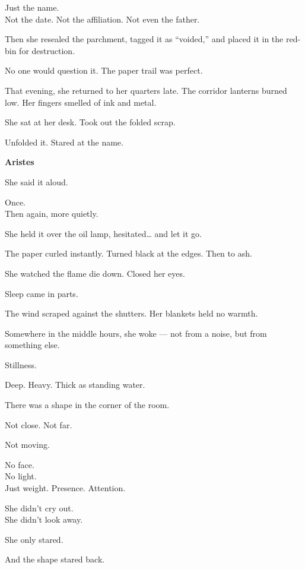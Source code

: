 \documentclass[9pt]{article}
\begin{document}
Just the name.\\
Not the date. Not the affiliation. Not even the father.

Then she resealed the parchment, tagged it as “voided,” and placed it in the red-bin for destruction.

No one would question it. The paper trail was perfect.

\vspace{1em}

That evening, she returned to her quarters late. The corridor lanterns burned low. Her fingers smelled of ink and metal.

She sat at her desk. Took out the folded scrap.

Unfolded it. Stared at the name.

\begin{center}
\textbf{Aristes}
\end{center}

She said it aloud.

Once.\\
Then again, more quietly.

She held it over the oil lamp, hesitated… and let it go.

The paper curled instantly. Turned black at the edges. Then to ash.

She watched the flame die down. Closed her eyes.

\vspace{1em}

Sleep came in parts.

The wind scraped against the shutters. Her blankets held no warmth.

Somewhere in the middle hours, she woke --- not from a noise, but from something else.

Stillness.

Deep. Heavy. Thick as standing water.

There was a shape in the corner of the room.

Not close. Not far.

Not moving.

No face.\\
No light.\\
Just weight. Presence. Attention.

She didn’t cry out.\\
She didn’t look away.

She only stared.

And the shape stared back.
\end{document}
